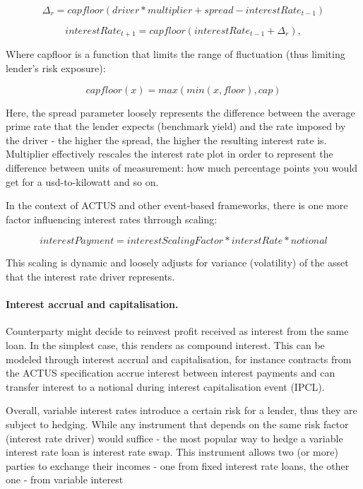 \documentclass[runningheads]{llncs}
\begin{document}
\noindent 
\begin{equation}
\Delta_{r}=capfloor(driver*multiplier+spread-interestRate_{t-1})
\end{equation}

\noindent 
\begin{equation}
interestRate_{t+1}=capfloor(interestRate_{t-1}+\Delta_{r}),
\end{equation}

Where capfloor is a function that limits the range of fluctuation
(thus limiting lender's risk exposure):

\noindent 
\begin{equation}
capfloor(x)=max(min(x,floor),cap)
\end{equation}

Here, the spread parameter loosely represents the difference between
the average prime rate that the lender expects (benchmark yield) and
the rate imposed by the driver - the higher the spread, the higher
the resulting interest rate is. Multiplier effectively rescales the
interest rate plot in order to represent the difference between units
of measurement: how much percentage points you would get for a usd-to-kilowatt
and so on.

In the context of ACTUS and other event-based frameworks, there is
one more factor influencing interest rates thrrough scaling:

\noindent 
\begin{equation}
interestPayment=interestScalingFactor*interstRate*notional
\end{equation}

This scaling is dynamic and loosely adjusts for variance (volatility)
of the asset that the interest rate driver represents.

\paragraph*{Interest accrual and capitalisation. }

Counterparty might decide to reinvest profit received as interest
from the same loan. In the simplest case, this renders as compound
interest. This can be modeled through interest accrual and capitalisation,
for instance contracts from the ACTUS specification accrue interest
between interest payments and can transfer interest to a notional
during interest capitalisation event (IPCL).

Overall, variable interest rates introduce a certain risk for a lender,
thus they are subject to hedging. While any instrument that depends
on the same risk factor (interest rate driver) would suffice - the
most popular way to hedge a variable interest rate loan is interest
rate swap. This instrument allows two (or more) parties to exchange
their incomes - one from fixed interest rate loans, the other one
- from variable interest
\end{document}
